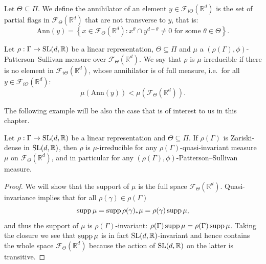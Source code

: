 \documentclass{report}
\begin{document}
\begin{definition}
    Let $\Theta \subseteq \Pi$.
    We define the annihilator of an element $y \in \mathcal F_{i \Theta}(\mathbb R^d)$ is the set of partial flags in $\mathcal F_\Theta(\mathbb R^d)$ that are not transverse to $y$, that is:
    \[
        \mathrm{Ann}(y) = \left\{ x \in \mathcal F_{\Theta}(\mathbb R^d) : x^\theta \cap y^{d- \theta} \neq 0 \text{ for some } \theta \in \Theta \right\}.
    \]    
\end{definition}

\begin{definition}
    \label{def:mu_irreducible}
Let $\rho: \Gamma \to \operatorname{{\mathrm{SL}}}(d,\mathbb R)$ be a linear representation, $\Theta \subseteq \Pi$ and $\mu$ a $(\rho(\Gamma), \phi)$-Patterson--Sullivan measure over $\mathcal F_\Theta(\mathbb R^d)$.
We say that $\rho$ is $\mu$-irreducible if there is no element in $\mathcal F_{i \Theta}(\mathbb R^d)$, whose annihilator is of full measure, i.e.\ for all $y \in \mathcal F_{i \Theta}(\mathbb R^d)$:
\[
    \mu(\mathrm{Ann}(y)) < \mu(\mathcal F_{\Theta}(\mathbb R^d)).
\]
\end{definition}

The following example will be also the case that is of interest to us in this chapter.
\begin{example}\label{ex:ZariskiDense}
    Let $\rho: \Gamma \to \operatorname{{\mathrm{SL}}}(d,\mathbb R)$ be a linear representation and $\Theta \subseteq \Pi$.
    If $\rho(\Gamma)$ is Zariski-dense in $\operatorname{{\mathrm{SL}}} (d, \mathbb R)$, then $\rho$ is $\mu$-irreducible for any $\rho(\Gamma)$-quasi-invariant measure $\mu$ on $\mathcal F_\Theta(\mathbb R^d)$, and in particular for any $(\rho(\Gamma), \phi)$-Patterson--Sullivan measure.
\end{example}
\begin{proof}
    We will show that the support of $\mu$ is the full space $\mathcal F_\Theta(\mathbb R^d)$.
    Quasi-invariance implies that for all $\rho(\gamma) \in \rho(\Gamma)$
    \[
    \operatorname{supp} \mu = \operatorname{supp} \rho(\gamma)_* \mu = \rho(\gamma) \operatorname{supp} \mu,
    \]
    and thus the support of $\mu$ is $\rho(\Gamma)$-invariant: $\rho(\Gamma) \operatorname{supp} \mu = \rho(\Gamma) \operatorname{supp} \mu$.
    Taking the closure we see that $\operatorname{supp} \mu$ is in fact $\operatorname{{\mathrm{SL}}}(d, \mathbb R)$-invariant and hence contains the whole space $\mathcal F_\Theta(\mathbb R^d)$ because the action of $\operatorname{{\mathrm{SL}}}(d, \mathbb R)$ on the latter is transitive.
\end{proof}
\end{document}
